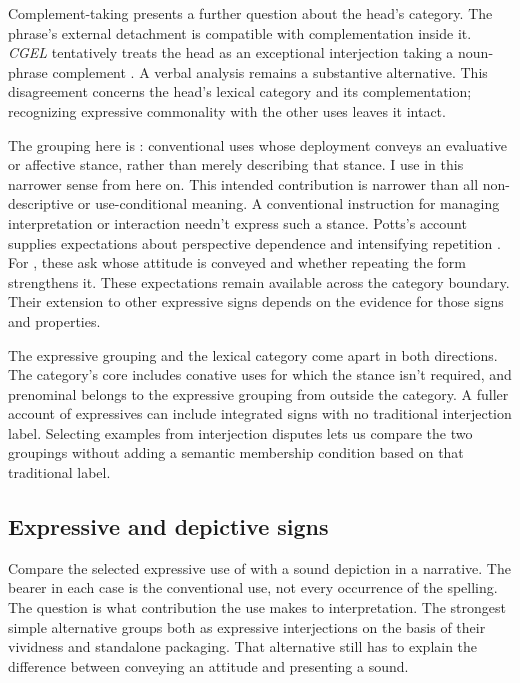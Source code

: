 \documentclass[12pt]{article}
\begin{document}
Complement-taking  presents a further
question about the head's category. The phrase's external detachment is
compatible with complementation inside it. \textit{CGEL} tentatively treats
the head as an exceptional interjection taking a noun-phrase complement
\citep[1361 n.~70]{HuddlestonPullum2002}. A verbal analysis remains a
substantive alternative. This disagreement concerns the head's lexical
category and its complementation; recognizing expressive commonality with
the other  uses leaves it intact.

The grouping here is : conventional uses whose
deployment conveys an evaluative or affective stance, rather than merely
describing that stance. I use  in this narrower sense from
here on. This intended contribution is narrower than
all non-descriptive or use-conditional meaning. A conventional instruction
for managing interpretation or interaction needn't express such a stance.
Potts's account supplies expectations about perspective dependence and
intensifying repetition \citep[166--167]{potts2007}. For ,
these ask whose attitude is conveyed and whether repeating the form
strengthens it. These expectations remain available across the category
boundary. Their extension to other expressive signs
depends on the evidence for those signs and properties.

The expressive grouping and the lexical category come apart in both
directions. The category's core includes conative uses for which the stance
isn't required, and prenominal  belongs to the expressive
grouping from outside the category. A fuller account of expressives can include integrated signs
with no traditional interjection label. Selecting examples from interjection
disputes lets us compare the two groupings without adding a semantic
membership condition based on that traditional label.

\subsection{Expressive and depictive signs}\label{sec:expressive-depictive}

Compare the selected expressive use of  with a sound depiction
 in a narrative. The bearer in each case is the conventional
use, not every occurrence of the spelling. The question is what contribution
the use makes to interpretation. The strongest simple alternative groups
both as expressive interjections on the basis of their vividness and
standalone packaging. That alternative still has to explain the difference
between conveying an attitude and presenting a sound.
\end{document}
